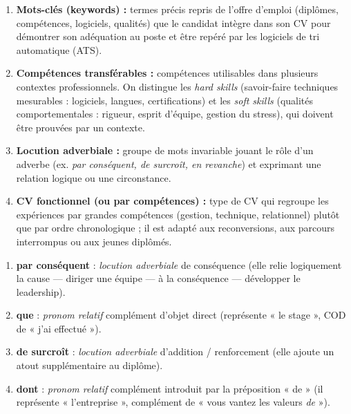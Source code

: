 \documentclass[11pt]{article}
\begin{document}
\begin{corrige}
\begin{enumerate}
\item \textbf{Mots-clés (keywords) :} termes précis repris de l'offre d'emploi (diplômes, compétences, logiciels, qualités) que le candidat intègre dans son CV pour démontrer son adéquation au poste et être repéré par les logiciels de tri automatique (ATS).
\item \textbf{Compétences transférables :} compétences utilisables dans plusieurs contextes professionnels. On distingue les \emph{hard skills} (savoir-faire techniques mesurables : logiciels, langues, certifications) et les \emph{soft skills} (qualités comportementales : rigueur, esprit d'équipe, gestion du stress), qui doivent être prouvées par un contexte.
\item \textbf{Locution adverbiale :} groupe de mots invariable jouant le rôle d'un adverbe (ex. \emph{par conséquent, de surcroît, en revanche}) et exprimant une relation logique ou une circonstance.
\item \textbf{CV fonctionnel (ou par compétences) :} type de CV qui regroupe les expériences par grandes compétences (gestion, technique, relationnel) plutôt que par ordre chronologique ; il est adapté aux reconversions, aux parcours interrompus ou aux jeunes diplômés.
\end{enumerate}
\end{corrige}

\begin{corrige}
\begin{enumerate}
\item \textbf{par conséquent} : \emph{locution adverbiale} de conséquence (elle relie logiquement la cause — diriger une équipe — à la conséquence — développer le leadership).
\item \textbf{que} : \emph{pronom relatif} complément d'objet direct (représente « le stage », COD de « j'ai effectué »).
\item \textbf{de surcroît} : \emph{locution adverbiale} d'addition / renforcement (elle ajoute un atout supplémentaire au diplôme).
\item \textbf{dont} : \emph{pronom relatif} complément introduit par la préposition « de » (il représente « l'entreprise », complément de « vous vantez les valeurs \emph{de} »).
\end{enumerate}
\end{corrige}
\end{document}
